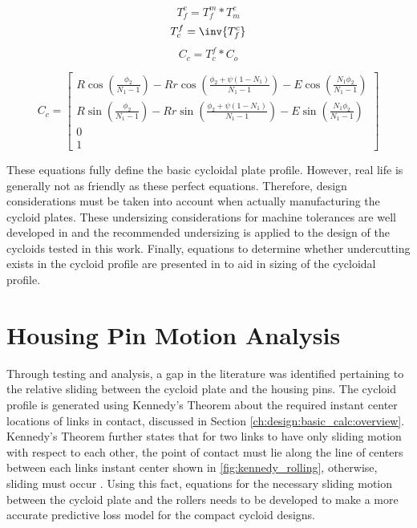\begin{equation} \label{eq:T_fc}
T_f^c = T_f^m * T_m^c 
\end{equation}
\begin{equation} \label{eq:T_cf}
T_c^f = \inv{T_f^c}
\end{equation}
\begin{equation} \label{eq:Cc}
C_c = T_c^f * C_o
\end{equation}

\begin{equation} \label{eq:single_profile}
C_c = \left[\begin{array}{c}
		R\cos(\frac{\phi_2}{N_1 -1}) - Rr\cos(\frac{\phi_2 + \psi(1-N_1)}{N_1-1}) - E\cos(\frac{N_1\phi_2}{N_1-1})\\
		R\sin(\frac{\phi_2}{N_1 -1}) - Rr\sin(\frac{\phi_2 + \psi(1-N_1)}{N_1-1}) - E\sin(\frac{N_1\phi_2}{N_1-1})\\
		0\\
		1
		\end{array} \right]
\end{equation}

These equations fully define the basic cycloidal plate profile. However, real life is generally not as friendly as these perfect equations. Therefore, design considerations must be taken into account when actually manufacturing the cycloid plates. These undersizing considerations for machine tolerances are well developed in \cite{ref:design_and_application} and the recommended undersizing is applied to the design of the cycloids tested in this work. Finally, equations to determine whether undercutting exists in the cycloid profile are presented in \cite{ref:ye} to aid in sizing of the cycloidal profile. 




\section{Housing Pin Motion Analysis} \label{ch:design:pin_roll_1s}

Through testing and analysis, a gap in the literature was identified pertaining to the relative sliding between the cycloid plate and the housing pins. The cycloid profile is generated using Kennedy's Theorem about the required instant center locations of links in contact, discussed in Section \ref{ch:design:basic_calc:overview}. Kennedy's Theorem further states that for two links to have only sliding motion with respect to each other, the point of contact must lie along the line of centers between each links instant center shown in \ref{fig:kennedy_rolling}, otherwise, sliding must occur \cite{ref:kinematics_and_dynamics}. Using this fact, equations for the necessary sliding motion between the cycloid plate and the rollers needs to be developed to make a more accurate predictive loss model for the compact cycloid designs.

